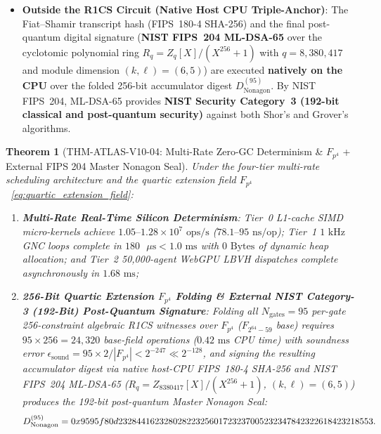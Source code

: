 \documentclass[11pt,a4paper,reqno]{article}
\def\texttt#1{#1}%
\def\mathcal#1{#1}%
\def\mathbb#1{#1}%
\theoremstyle{plain}
\newtheorem{theorem}{Theorem}[section]
\theoremstyle{definition}
\theoremstyle{remark}
\numberwithin{equation}{section}
\begin{document}
\begin{enumerate}[leftmargin=1.8em,itemsep=2pt]
\begin{itemize}[leftmargin=1.5em,itemsep=1pt]
    \item \textbf{Outside the R1CS Circuit (Native Host CPU Triple-Anchor)}: The Fiat--Shamir transcript hash (FIPS~180-4 SHA-256) and the final post-quantum digital signature (\textbf{NIST FIPS~204 ML-DSA-65} over the cyclotomic polynomial ring $\mathcal{R}_q = \mathbb{Z}_q[X]/(X^{256}+1)$ with $q = 8,380,417$ and module dimension $(k,\ell) = (6,5)$) are executed \textbf{natively on the CPU} over the folded 256-bit accumulator digest $\mathcal{D}_{\text{Nonagon}}^{(95)}$. By NIST FIPS~204, ML-DSA-65 provides \textbf{NIST Security Category~3 (192-bit classical and post-quantum security)} against both Shor's and Grover's algorithms.
  \end{itemize}
\end{enumerate}

\begin{theorem}[{\texttt{THM-ATLAS-V10-04}: Multi-Rate Zero-GC Determinism \& $\mathbb{F}_{p^4}$ + External FIPS 204 Master Nonagon Seal}]
\label{thm:master_octalogy_seal}
Under the four-tier multi-rate scheduling architecture and the quartic extension field $\mathbb{F}_{p^4}$~\eqref{eq:quartic_extension_field}:
\begin{enumerate}[leftmargin=1.8em,itemsep=2pt]
  \item \textbf{Multi-Rate Real-Time Silicon Determinism}: Tier~0 L1-cache SIMD micro-kernels achieve $1.05\text{--}1.28 \times 10^7\text{ ops/s}$ ($78.1\text{--}95\text{ ns/op}$); Tier~1 $1\text{ kHz}$ GNC loops complete in $180\text{ }\mu\text{s} < 1.0\text{ ms}$ with $0\text{ Bytes}$ of dynamic heap allocation; and Tier~2 50,000-agent WebGPU LBVH dispatches complete asynchronously in $1.68\text{ ms}$;
  \item \textbf{256-Bit Quartic Extension $\mathbb{F}_{p^4}$ Folding \& External NIST Category-3 (192-Bit) Post-Quantum Signature}: Folding all $N_{\text{gates}} = 95$ per-gate 256-constraint algebraic R1CS witnesses over $\mathbb{F}_{p^4}$ ($\mathbb{F}_{2^{64}-59}$ base) requires $95 \times 256 = 24,320$ base-field operations ($0.42\text{ ms}$ CPU time) with soundness error $\epsilon_{\text{sound}} = 95 \times 2 / |\mathbb{F}_{p^4}| < 2^{-247} \ll 2^{-128}$, and signing the resulting accumulator digest via native host-CPU FIPS~180-4 SHA-256 and NIST FIPS~204 ML-DSA-65 ($\mathcal{R}_q = \mathbb{Z}_{8380417}[X]/(X^{256}+1)$, $(k,\ell)=(6,5)$) produces the 192-bit post-quantum Master Nonagon Seal:
  \begin{equation}
    \mathcal{D}_{\text{Nonagon}}^{(95)} = {\small\texttt{0x9595f80d23284416232802822325601723237005232347842322618423218553}}.
    \label{eq:master_85_seal}
  \end{equation}
\end{enumerate}
\end{theorem}
\end{document}

